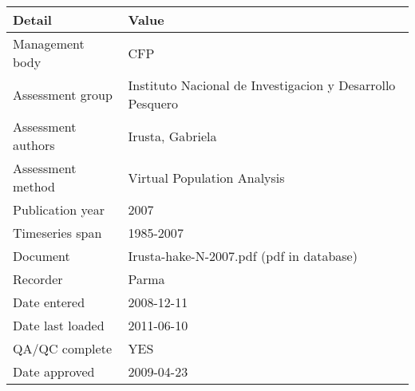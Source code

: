 \begin{table}[htb]
\centering
\begin{tabular}{lp{7cm}}
\toprule
Detail & Value \\
\midrule
Management body    & CFP                                                       \\
Assessment group   & Instituto Nacional de Investigacion y Desarrollo Pesquero \\
Assessment authors & Irusta, Gabriela                                          \\
Assessment method  & Virtual Population Analysis                               \\
Publication year   & 2007                                                      \\
Timeseries span    & 1985-2007                                                 \\
Document           & Irusta-hake-N-2007.pdf (pdf in database)                  \\
Recorder           & Parma                                                     \\
Date entered       & 2008-12-11                                                \\
Date last loaded   & 2011-06-10                                                \\
QA/QC complete     & YES                                                       \\
Date approved      & 2009-04-23                                                \\
\bottomrule
\end{tabular}
\label{tab:assessdet}
\end{table}
